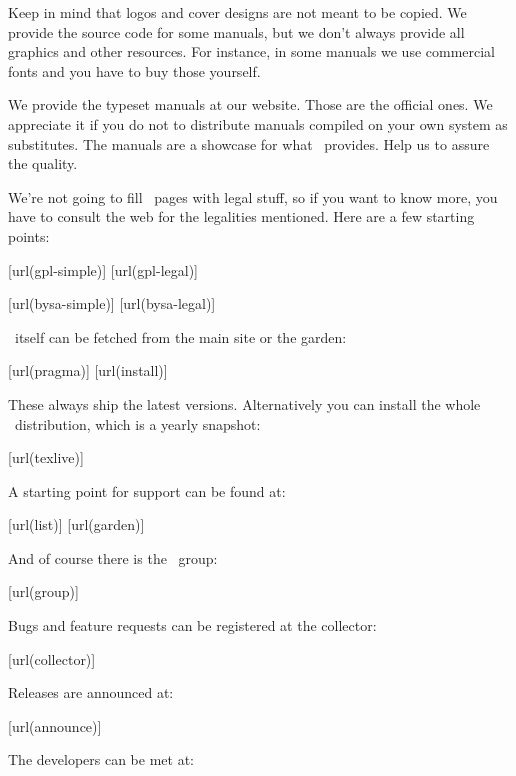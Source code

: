 Keep in mind that logos and cover designs are not meant to be copied. We provide
the source code for some manuals, but we don't always provide all graphics and
other resources. For instance, in some manuals we use commercial fonts and you
have to buy those yourself.

We provide the typeset manuals at our website. Those are the official ones. We
appreciate it if you do not to distribute manuals compiled on your own system as
substitutes. The manuals are a showcase for what \CONTEXT\ provides. Help us to
assure the quality.

\stopsubject

\startsubject[title={More information}]

We're not going to fill ~pages with legal stuff, so if you want to
know more, you have to consult the web for the legalities mentioned. Here are a
few starting points:

\startlines
{}[url(gpl-simple)]
[url(gpl-legal)]
\stoplines

\startlines
{}[url(bysa-simple)]
[url(bysa-legal)]
\stoplines

\CONTEXT\ itself can be fetched from the main site or the garden:

\startlines
\goto{\url[pragma]}[url(pragma)]
\goto{\url[install]}[url(install)]
\stoplines

These always ship the latest versions. Alternatively you can install the whole
\TEX\ distribution, which is a yearly snapshot:

\startlines
\goto{\url[texlive]}[url(texlive)]
\stoplines

A starting point for support can be found at:

\startlines
\goto{\url[list]}[url(list)]
\goto{\url[garden]}[url(garden)]
\stoplines

And of course there is the \CONTEXT\ group:

\startlines
\goto{\url[group]}[url(group)]
\stoplines

Bugs and feature requests can be registered at the collector:

\startlines
\goto{\url[collector]}[url(collector)]
\stoplines

Releases are announced at:

\startlines
\goto{\url[announce]}[url(announce)]
\stoplines

The developers can be met at:


